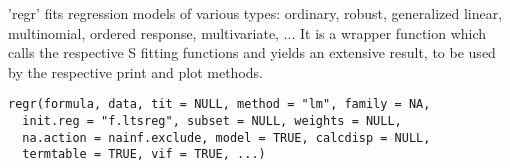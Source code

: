 \documentclass{article}
\begin{document}
\begin{Description}\relax
'regr' fits regression models of various types: ordinary, robust,
generalized linear, multinomial, ordered response, multivariate, ... \bsl{}
It is a wrapper function which calls the respective S fitting
functions and yields an extensive result, to be used by the
respective print and plot methods.
\end{Description}
\begin{Usage}
\begin{verbatim}
regr(formula, data, tit = NULL, method = "lm", family = NA,
  init.reg = "f.ltsreg", subset = NULL, weights = NULL,
  na.action = nainf.exclude, model = TRUE, calcdisp = NULL,
  termtable = TRUE, vif = TRUE, ...)
\end{verbatim}
\end{Usage}
\end{document}
